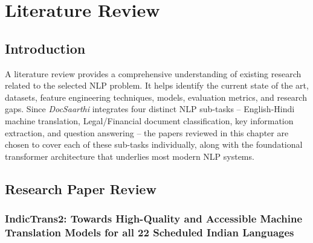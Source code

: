 \chapter{Literature Review}

\section{Introduction}

A literature review provides a comprehensive understanding of existing research related to the selected NLP problem. It helps identify the current state of the art, datasets, feature engineering techniques, models, evaluation metrics, and research gaps. Since \textit{DocSaarthi} integrates four distinct NLP sub-tasks -- English-Hindi machine translation, Legal/Financial document classification, key information extraction, and question answering -- the papers reviewed in this chapter are chosen to cover each of these sub-tasks individually, along with the foundational transformer architecture that underlies most modern NLP systems.

\newpage
\section{Research Paper Review}
\subsection{IndicTrans2: Towards High-Quality and Accessible Machine Translation Models for all 22 Scheduled Indian Languages}

\def\PaperTitle{IndicTrans2}
\def\PaperLabel{tab:paper1}

\renewcommand{\arraystretch}{1.4}

